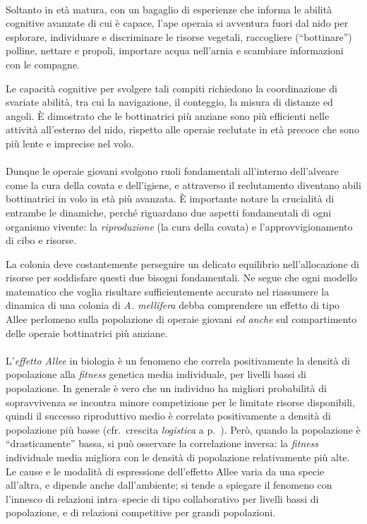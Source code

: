 \paragraph{}
Soltanto in età matura, con un bagaglio di esperienze che informa le abilità cognitive avanzate di cui è capace, l'ape operaia si avventura fuori dal nido per esplorare, individuare e discriminare le risorse vegetali,
raccogliere (``bottinare'') polline, nettare e propoli, importare acqua nell'arnia e scambiare informazioni con le compagne.

Le capacità cognitive per svolgere tali compiti richiedono la coordinazione di svariate abilità, tra cui la navigazione, il conteggio, la misura di distanze ed angoli.
È dimostrato che le bottinatrici più anziane sono più efficienti nelle attività all'esterno del nido, rispetto alle operaie reclutate in età precoce che sono più lente e imprecise nel volo.

\paragraph{}
Dunque le operaie giovani svolgono ruoli fondamentali all'interno dell'alveare come la cura della covata e dell'igiene, e attraverso il reclutamento diventano abili bottinatrici in volo in età più avanzata.
È importante notare la crucialità di entrambe le dinamiche, perché riguardano due aspetti fondamentali di ogni organismo vivente: la \emph{riproduzione} (la cura della covata) e l'approvvigionamento di cibo e risorse.

La colonia deve costantemente perseguire un delicato equilibrio nell'allocazione di risorse per soddisfare questi due bisogni fondamentali.
Ne segue che ogni modello matematico che voglia risultare sufficientemente accurato nel riassumere la dinamica di una colonia di \emph{A. mellifera} debba comprendere un effetto di tipo Allee perlomeno sulla popolazione di operaie giovani
\emph{ed anche} sul compartimento delle operaie bottinatrici più anziane.

\paragraph{}
\label{par:alleeEffect}
L'\emph{effetto Allee} in biologia è un fenomeno che correla positivamente la densità di popolazione alla
\emph{fitness} genetica media individuale, per livelli bassi di popolazione.
In generale è vero che un individuo ha migliori probabilità di sopravvivenza se incontra minore competizione per le
limitate risorse disponibili, quindi il successo riproduttivo medio è correlato positivamente a densità di popolazione
più basse (cfr.~crescita \emph{logistica} a p.~\pageref{sec:logistic}).
Però, quando la popolazione è ``drasticamente'' bassa, si può osservare la correlazione inversa: la \emph{fitness}
individuale media migliora con le densità di popolazione relativamente più alte.
Le cause e le modalità di espressione dell'effetto Allee varia da una specie all'altra, e dipende anche dall'ambiente;
si tende a spiegare il fenomeno con l'innesco di relazioni intra--specie di tipo collaborativo per livelli bassi di
popolazione, e di relazioni competitive per grandi popolazioni.

